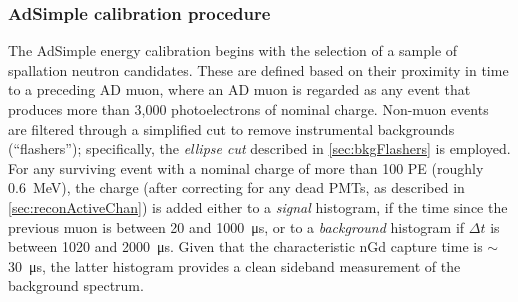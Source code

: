 \documentclass[../thesis.tex]{subfiles}
\begin{document}
\begin{comment}
  A sample enriched in such neutrons is obtained by selecting events in a time window (XXX define) immediately after AD muons (XXX of what minimum energy?). These captures are distributed uniformly throughout the GdLS, much like IBDs. The nGd capture peak in the charge distribution is fit to a Gaussian (XXX crystal ball?), and the location of the peak is defined as corresponding to 7.95 MeV (XXX) 8.0 MeV according to doc-7334 (AdSimple). This energy scale is stored in the offline database, valid for the period in which the neutrons were collected. In the near (far) halls, it takes XXX (YYY) days to obtain the necessary statistics; this is thus the time-resolution of the energy scale, which is sufficient, given that the light yield changes very slowly, declining by some 1\% to 1.5\% per year.
  
24 hours
\end{comment}

\begin{comment}
  Figure out exactly what energy is pegged by AdSimple and AdScaled. 7.95 MeV? Discuss differences (e.g. due to muon afterpulsing?)
  5x15min Co60
  4x10hour AmC
\end{comment}

\subsubsection{AdSimple calibration procedure}
\label{sec:reconEnergyAdSimpleCalib}

The AdSimple energy calibration begins with the selection of a sample of spallation neutron candidates. These are defined based on their proximity in time to a preceding AD muon, where an AD muon is regarded as any event that produces more than 3,000 photoelectrons of nominal charge. Non-muon events are filtered through a simplified cut to remove instrumental backgrounds (``flashers''); specifically, the \emph{ellipse cut} described in \autoref{sec:bkgFlashers} is employed. For any surviving event with a nominal charge of more than 100 PE (roughly 0.6~MeV), the charge (after correcting for any dead PMTs, as described in \autoref{sec:reconActiveChan}) is added either to a \emph{signal} histogram, if the time since the previous muon is between 20 and \SI{1000}{\micro s}, or to a \emph{background} histogram if $\Delta t$ is between 1020 and \SI{2000}{\micro s}. Given that the characteristic nGd capture time is $\sim$\SI{30}{\micro s}, the latter histogram provides a clean sideband measurement of the background spectrum.
\end{document}
